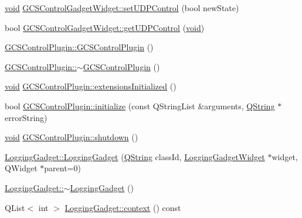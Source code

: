 \begin{DoxyCompactItemize}
\item 
\hyperlink{group___u_a_v_objects_plugin_ga444cf2ff3f0ecbe028adce838d373f5c}{void} \hyperlink{group___g_c_s_control_gadget_plugin_ga8e3fea7e5b4e9a7811faccbbe646ad37}{\-G\-C\-S\-Control\-Gadget\-Widget\-::set\-U\-D\-P\-Control} (bool new\-State)
\item 
bool \hyperlink{group___g_c_s_control_gadget_plugin_ga0354d422f9780a2e5fb610c0decf3e13}{\-G\-C\-S\-Control\-Gadget\-Widget\-::get\-U\-D\-P\-Control} (\hyperlink{group___u_a_v_objects_plugin_ga444cf2ff3f0ecbe028adce838d373f5c}{void})
\item 
\hyperlink{group___g_c_s_control_gadget_plugin_gaa5bf178769d6fdc89db0176db639c02a}{\-G\-C\-S\-Control\-Plugin\-::\-G\-C\-S\-Control\-Plugin} ()
\item 
\hyperlink{group___g_c_s_control_gadget_plugin_gaa8f4c5803ed27c6a490522181ad40efa}{\-G\-C\-S\-Control\-Plugin\-::$\sim$\-G\-C\-S\-Control\-Plugin} ()
\item 
\hyperlink{group___u_a_v_objects_plugin_ga444cf2ff3f0ecbe028adce838d373f5c}{void} \hyperlink{group___g_c_s_control_gadget_plugin_gad526ae3249e30303394221453d4483a2}{\-G\-C\-S\-Control\-Plugin\-::extensions\-Initialized} ()
\item 
bool \hyperlink{group___g_c_s_control_gadget_plugin_ga57b8a6ede4344b5a2e3e9460b158dde8}{\-G\-C\-S\-Control\-Plugin\-::initialize} (const \-Q\-String\-List \&arguments, \hyperlink{group___u_a_v_objects_plugin_gab9d252f49c333c94a72f97ce3105a32d}{\-Q\-String} $\ast$error\-String)
\item 
\hyperlink{group___u_a_v_objects_plugin_ga444cf2ff3f0ecbe028adce838d373f5c}{void} \hyperlink{group___g_c_s_control_gadget_plugin_ga4c6e2d64333994bacf7db3c918057799}{\-G\-C\-S\-Control\-Plugin\-::shutdown} ()
\item 
\hyperlink{group___g_c_s_control_gadget_plugin_gaf04a39f8faf77df7657801a58bf39bf9}{\-Logging\-Gadget\-::\-Logging\-Gadget} (\hyperlink{group___u_a_v_objects_plugin_gab9d252f49c333c94a72f97ce3105a32d}{\-Q\-String} class\-Id, \hyperlink{class_logging_gadget_widget}{\-Logging\-Gadget\-Widget} $\ast$widget, \-Q\-Widget $\ast$parent=0)
\item 
\hyperlink{group___g_c_s_control_gadget_plugin_gabcd5577c6960598473ac23935c47c958}{\-Logging\-Gadget\-::$\sim$\-Logging\-Gadget} ()
\item 
\-Q\-List$<$ int $>$ \hyperlink{group___g_c_s_control_gadget_plugin_gadceb403447b87bafeda8fad2855d01bf}{\-Logging\-Gadget\-::context} () const 
\item 

\end{DoxyCompactItemize}
